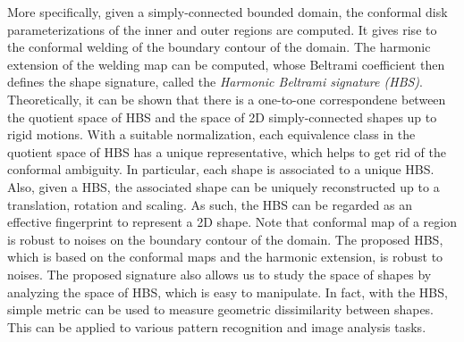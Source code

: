 \documentclass[review,onefignum,onetabnum]{siamonline190516}
\begin{document}

    More specifically, given a simply-connected bounded domain, the conformal disk parameterizations of the inner and outer regions are computed. It gives rise to the conformal welding of the boundary contour of the domain. The harmonic extension of the welding map can be computed, whose Beltrami coefficient then defines the shape signature, called the {\it Harmonic Beltrami signature (HBS)}. Theoretically, it can be shown that there is a one-to-one correspondene between the quotient space of HBS and the space of 2D simply-connected shapes up to rigid motions. With a suitable normalization, each equivalence class in the quotient space of HBS has a unique representative, which helps to get rid of the conformal ambiguity. In particular, each shape is associated to a unique HBS. Also, given a HBS, the associated shape can be uniquely reconstructed up to a translation, rotation and scaling. As such, the HBS can be regarded as an effective fingerprint to represent a 2D shape. Note that conformal map of a region is robust to noises on the boundary contour of the domain. The proposed HBS, which is based on the conformal maps and the harmonic extension, is robust to noises. The proposed signature also allows us to study the space of shapes by analyzing the space of HBS, which is easy to manipulate. In fact, with the HBS, simple metric can be used to measure geometric dissimilarity between shapes. This can be applied to various pattern recognition and image analysis tasks.
    
\end{document}
